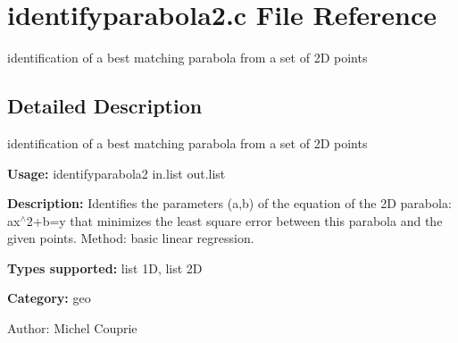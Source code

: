 \section{identifyparabola2.c File Reference}
\label{identifyparabola2_8c}
identification of a best matching parabola from a set of 2D points 



\subsection{Detailed Description}
identification of a best matching parabola from a set of 2D points 

{\bf Usage:} identifyparabola2 in.list out.list

{\bf Description:} Identifies the parameters (a,b) of the equation of the 2D parabola: ax$^\wedge$2+b=y that minimizes the least square error between this parabola and the given points. Method: basic linear regression.

{\bf Types supported:} list 1D, list 2D

{\bf Category:} geo

\begin{Desc}
\item[Author:]Michel Couprie \end{Desc}
